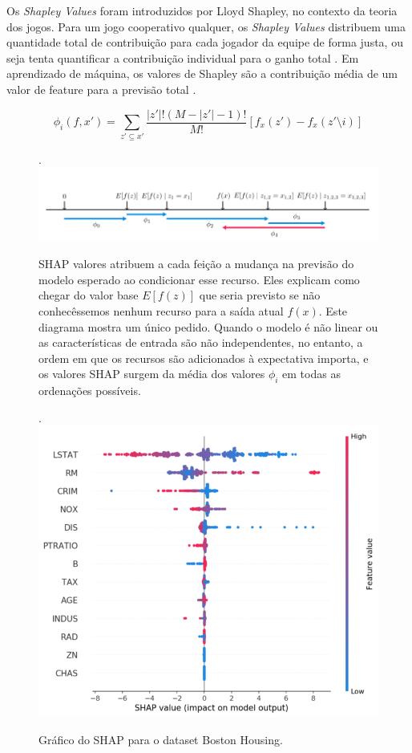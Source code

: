 Os \textit{Shapley Values} foram introduzidos por Lloyd Shapley, no contexto da teoria dos jogos. Para um jogo cooperativo qualquer, os \textit{Shapley Values} distribuem uma quantidade total de contribuição para cada jogador da equipe de forma justa, ou seja tenta quantificar a contribuição individual para o ganho total \cite{shapley}. Em aprendizado de máquina, os valores de Shapley são a contribuição média de um valor de feature para a previsão total \cite{iee:artigo:shap}.

\begin{equation}
    \phi_i(f,x') = \sum_{z'\subseteq x'} \frac{|z'|!(M-|z'|-1)!}{M!}[f_x(z')-f_x(z'\setminus i)]
\end{equation}

\begin{figure}[H]
 \caption{SHAP valores atribuem a cada feição a mudança na previsão do modelo esperado ao condicionar esse recurso. Eles explicam como chegar do valor base $E[f (z)]$ que seria previsto se não conhecêssemos nenhum recurso para a saída atual $f(x)$. Este diagrama mostra um único pedido. Quando o modelo é não linear ou as características de entrada são não independentes, no entanto, a ordem em que os recursos são adicionados à expectativa importa, e os valores SHAP surgem da média dos valores $\phi_i$ em todas as ordenações possíveis. \cite{shap:article}}.
 \label{fig:ex:shap2}
 \centering
 \includegraphics[scale=0.4]{images/shap_value_artigo.png}
\end{figure}

\begin{figure}[H]
 \caption{Gráfico do SHAP para o dataset Boston Housing.}.
 \label{fig:ex:shap_housing}
 \centering
 \includegraphics[scale=0.4]{images/shap_example_house.png}
\end{figure}

